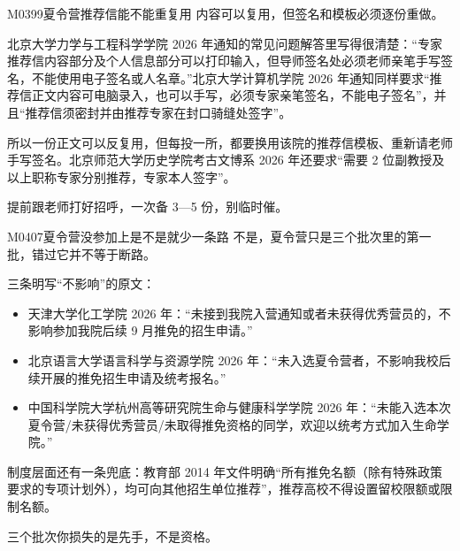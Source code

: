 \begin{qa}{M0399}{夏令营推荐信能不能重复用}
内容可以复用，但签名和模板必须逐份重做。

北京大学力学与工程科学学院 2026 年通知的常见问题解答里写得很清楚：“专家推荐信内容部分及个人信息部分可以打印输入，但导师签名处必须老师亲笔手写签名，不能使用电子签名或人名章。”北京大学计算机学院 2026 年通知同样要求“推荐信正文内容可电脑录入，也可以手写，必须专家亲笔签名，不能电子签名”，并且“推荐信须密封并由推荐专家在封口骑缝处签字”。

所以一份正文可以反复用，但每投一所，都要换用该院的推荐信模板、重新请老师手写签名。北京师范大学历史学院考古文博系 2026 年还要求“需要 2 位副教授及以上职称专家分别推荐，专家本人签字”。

提前跟老师打好招呼，一次备 3—5 份，别临时催。
\end{qa}

\begin{qa}{M0407}{夏令营没参加上是不是就少一条路}
不是，夏令营只是三个批次里的第一批，错过它并不等于断路。

三条明写“不影响”的原文：
\begin{itemize}
  \item 天津大学化工学院 2026 年：“未接到我院入营通知或者未获得优秀营员的，不影响参加我院后续 9 月推免的招生申请。”
  \item 北京语言大学语言科学与资源学院 2026 年：“未入选夏令营者，不影响我校后续开展的推免招生申请及统考报名。”
  \item 中国科学院大学杭州高等研究院生命与健康科学学院 2026 年：“未能入选本次夏令营/未获得优秀营员/未取得推免资格的同学，欢迎以统考方式加入生命学院。”
\end{itemize}

制度层面还有一条兜底：教育部 2014 年文件明确“所有推免名额（除有特殊政策要求的专项计划外），均可向其他招生单位推荐”，推荐高校不得设置留校限额或限制名额。

三个批次你损失的是先手，不是资格。
\end{qa}

